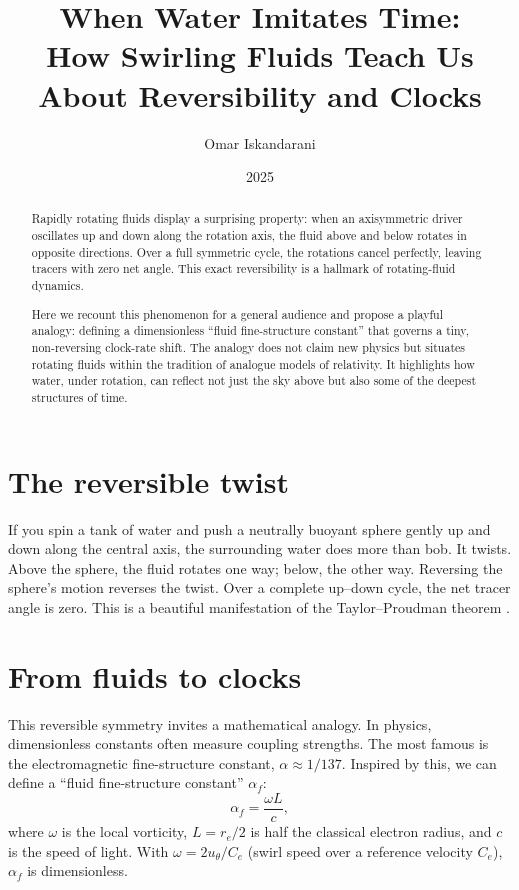 \documentclass[12pt]{article}
\title{When Water Imitates Time: \\
How Swirling Fluids Teach Us About Reversibility and Clocks}
\author{Omar Iskandarani}
\date{2025}
\begin{document}
    \maketitle

    \begin{abstract}
        Rapidly rotating fluids display a surprising property: when an axisymmetric driver oscillates up and down along the rotation axis, the fluid above and below rotates in opposite directions. Over a full symmetric cycle, the rotations cancel perfectly, leaving tracers with zero net angle. This exact reversibility is a hallmark of rotating-fluid dynamics.

        Here we recount this phenomenon for a general audience and propose a playful analogy: defining a dimensionless ``fluid fine-structure constant'' that governs a tiny, non-reversing clock-rate shift. The analogy does not claim new physics but situates rotating fluids within the tradition of analogue models of relativity. It highlights how water, under rotation, can reflect not just the sky above but also some of the deepest structures of time.
    \end{abstract}

    \section*{The reversible twist}
    If you spin a tank of water and push a neutrally buoyant sphere gently up and down along the central axis, the surrounding water does more than bob. It twists. Above the sphere, the fluid rotates one way; below, the other way. Reversing the sphere's motion reverses the twist. Over a complete up--down cycle, the net tracer angle is zero. This is a beautiful manifestation of the Taylor--Proudman theorem \cite{Proudman1916,Taylor1923,Greenspan1968}.

    \section*{From fluids to clocks}
    This reversible symmetry invites a mathematical analogy. In physics, dimensionless constants often measure coupling strengths. The most famous is the electromagnetic fine-structure constant, $\alpha \approx 1/137$. Inspired by this, we can define a ``fluid fine-structure constant'' $\alpha_f$:
    \[
        \alpha_f = \frac{\omega L}{c},
    \]
    where $\omega$ is the local vorticity, $L = r_e/2$ is half the classical electron radius, and $c$ is the speed of light. With $\omega = 2u_\theta/C_e$ (swirl speed over a reference velocity $C_e$), $\alpha_f$ is dimensionless.
\end{document}
